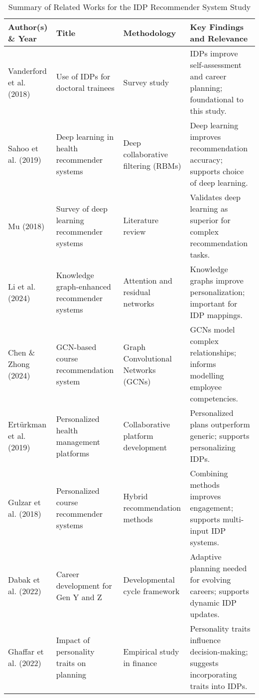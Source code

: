 \begin{leveldown}

\begin{table}[ht]
    \centering
    \caption{Summary of Related Works for the IDP Recommender System Study}
    \label{tab:lit_review}
    \begin{tabular}{@{}p{3cm}p{5cm}p{2cm}p{5cm}@{}}
    \toprule
    \textbf{Author(s) \& Year} & \textbf{Title} & \textbf{Methodology} & \textbf{Key Findings and Relevance} \\
    \midrule
    Vanderford et al. (2018) & Use of IDPs for doctoral trainees & Survey study & IDPs improve self-assessment and career planning; foundational to this study. \\
    \midrule
    Sahoo et al. (2019) & Deep learning in health recommender systems & Deep collaborative filtering (RBMs) & Deep learning improves recommendation accuracy; supports choice of deep learning. \\
    \midrule
    Mu (2018) & Survey of deep learning recommender systems & Literature review & Validates deep learning as superior for complex recommendation tasks. \\
    \midrule
    Li et al. (2024) & Knowledge graph-enhanced recommender systems & Attention and residual networks & Knowledge graphs improve personalization; important for IDP mappings. \\
    \midrule
    Chen \& Zhong (2024) & GCN-based course recommendation system & Graph Convolutional Networks (GCNs) & GCNs model complex relationships; informs modelling employee competencies. \\
    \midrule
    Ertürkman et al. (2019) & Personalized health management platforms & Collaborative platform development & Personalized plans outperform generic; supports personalizing IDPs. \\
    \midrule
    Gulzar et al. (2018) & Personalized course recommender systems & Hybrid recommendation methods & Combining methods improves engagement; supports multi-input IDP systems. \\
    \midrule
    Dabak et al. (2022) & Career development for Gen Y and Z & Developmental cycle framework & Adaptive planning needed for evolving careers; supports dynamic IDP updates. \\
    \midrule
    Ghaffar et al. (2022) & Impact of personality traits on planning & Empirical study in finance & Personality traits influence decision-making; suggests incorporating traits into IDPs. \\

\end{tabular}
\end{table}
\end{leveldown}
